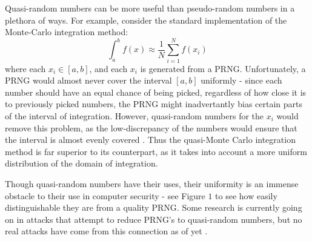 \documentclass[11pt]{article}
\begin{document}
Quasi-random numbers can be more useful than pseudo-random numbers in a plethora of ways. For example, consider the standard implementation of the Monte-Carlo integration method: $$\int_a^b f(x) \approx \frac{1}{N}\sum_{i = 1}^N f(x_i)$$ where each $x_i \in [a, b]$, and each $x_i$ is generated from a PRNG. Unfortunately, a PRNG would almost never cover the interval $[a, b]$  uniformly - since each number should have an equal chance of being picked, regardless of how close it is to previously picked numbers, the PRNG might inadvertantly bias certain parts of the interval of integration. However, quasi-random numbers for the $x_i$ would remove this problem, as the low-discrepancy of the numbers would ensure that the interval is almost evenly covered \cite{quasi}.  Thus the quasi-Monte Carlo integration method is far superior to its counterpart, as it takes into account a more uniform distribution of the domain of integration. 

Though quasi-random numbers have their uses, their uniformity is an immense obstacle to their use in computer security - see Figure $1$ to see how easily distinguishable they are from a quality PRNG. Some research is currently going on in attacks that attempt to reduce PRNG's to quasi-random numbers, but no real attacks have come from this connection as of yet \cite{quasi}. 
\end{document}
